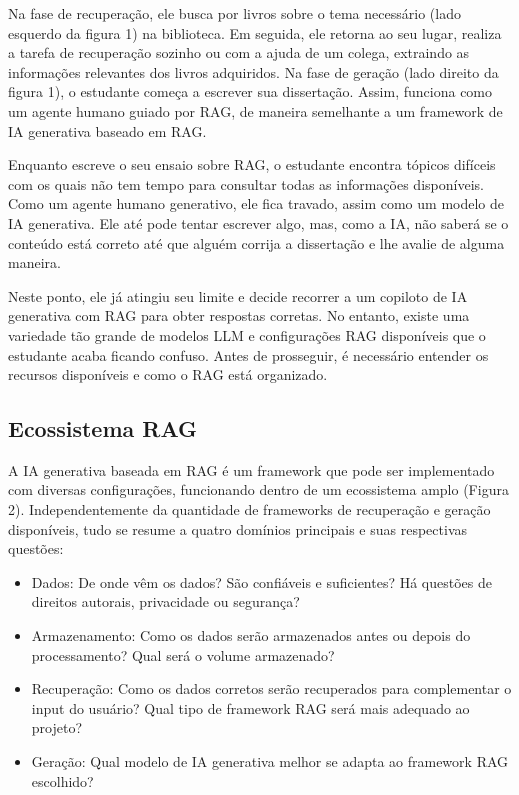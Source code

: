 \documentclass[a4paper, 12pt]{article}
\begin{document}
    Na fase de recuperação, ele busca por livros sobre o tema necessário (lado esquerdo da figura 1) na biblioteca. Em seguida, ele retorna ao seu lugar, realiza a tarefa de recuperação sozinho ou com a ajuda de um colega, extraindo as informações relevantes dos livros adquiridos. Na fase de geração (lado direito da figura 1), o estudante começa a escrever sua dissertação. Assim, funciona como um agente humano guiado por RAG, de maneira semelhante a um framework de IA generativa baseado em RAG.

    Enquanto escreve o seu ensaio sobre RAG, o estudante encontra tópicos difíceis com os quais não tem tempo para consultar todas as informações disponíveis. Como um agente humano generativo, ele fica travado, assim como um modelo de IA generativa. Ele até pode tentar escrever algo, mas, como a IA, não saberá se o conteúdo está correto até que alguém corrija a dissertação e lhe avalie de alguma maneira.

    Neste ponto, ele já atingiu seu limite e decide recorrer a um copiloto de IA generativa com RAG para obter respostas corretas. No entanto, existe uma variedade tão grande de modelos LLM e configurações RAG disponíveis que o estudante acaba ficando confuso. Antes de prosseguir, é necessário entender os recursos disponíveis e como o RAG está organizado.

    \subsection{Ecossistema RAG}

    A IA generativa baseada em RAG é um framework que pode ser implementado com diversas configurações, funcionando dentro de um ecossistema amplo (Figura 2). Independentemente da quantidade de frameworks de recuperação e geração disponíveis, tudo se resume a quatro domínios principais e suas respectivas questões:
    
    \begin{itemize}
        \item Dados: De onde vêm os dados? São confiáveis e suficientes? Há questões de direitos autorais, privacidade ou segurança?
        \item Armazenamento: Como os dados serão armazenados antes ou depois do processamento? Qual será o volume armazenado?
        \item Recuperação: Como os dados corretos serão recuperados para complementar o input do usuário? Qual tipo de framework RAG será mais adequado ao projeto?
        \item Geração: Qual modelo de IA generativa melhor se adapta ao framework RAG escolhido?
    \end{itemize} 
\end{document}
